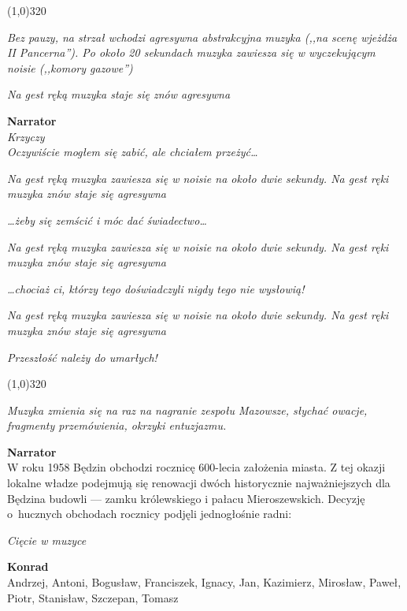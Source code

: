 \documentclass[11pt,a4paper,oneside]{article}
\begin{document}
\line(1,0){320}

{\color{light-gray} \emph{Bez pauzy, na strzał wchodzi agresywna
abstrakcyjna muzyka (,,na scenę wjeżdża II Pancerna''). Po około 20
sekundach muzyka zawiesza się w wyczekującym noisie (,,komory
gazowe'')}}

{\color{light-gray} \emph{Na gest ręką muzyka staje się znów
agresywna}}

\textbf{Narrator}\\
{\color{light-gray} \emph{Krzyczy}}\\
\emph{Oczywiście mogłem się zabić, ale chciałem przeżyć\dots{}} 

{\color{light-gray} \emph{Na gest ręką
muzyka zawiesza się w noisie na około dwie sekundy. Na gest ręki
muzyka znów staje się agresywna}}

\emph{\dots{}żeby się zemścić i móc dać świadectwo\dots{}}

{\color{light-gray} \emph{Na gest ręką
muzyka zawiesza się w noisie na około dwie sekundy. Na gest ręki
muzyka znów staje się agresywna}}

\emph{\dots{}chociaż ci, którzy tego doświadczyli nigdy tego nie wysłowią!}

{\color{light-gray} \emph{Na gest ręką
muzyka zawiesza się w noisie na około dwie sekundy. Na gest ręki
muzyka znów staje się agresywna}}

\emph{Przeszłość należy do umarłych!}

\line(1,0){320}

{\color{light-gray} \emph{Muzyka zmienia się na raz na nagranie
zespołu Mazowsze, słychać owacje, fragmenty przemówienia, okrzyki
entuzjazmu.}}

\textbf{Narrator}\\
W roku 1958 Będzin obchodzi rocznicę 600-lecia założenia miasta.
Z tej okazji lokalne władze podejmują się renowacji dwóch historycznie
najważniejszych dla Będzina budowli --- zamku królewskiego i pałacu
Mieroszewskich. Decyzję o~hucznych obchodach rocznicy podjęli
jednogłośnie radni:

{\color{light-gray} \emph{Cięcie w muzyce}}

{\color{konrad}
\textbf{Konrad}\\
Andrzej, Antoni, Bogusław, Franciszek, Ignacy, Jan, Kazimierz, Mirosław, 
Paweł, Piotr, Stanisław, Szczepan, Tomasz
}
\end{document}
